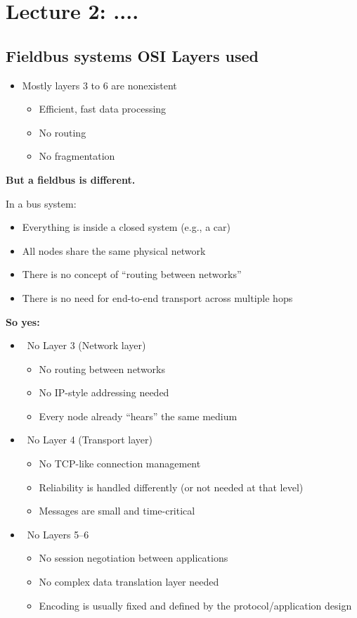 \chapter{Lecture 2: ....}\label{lec:2}
\section{Fieldbus systems OSI Layers used}

\begin{itemize}
\item Mostly layers 3 to 6 are nonexistent
\begin{itemize}
\item Efficient, fast data processing
\item No routing
\item No fragmentation
\end{itemize}
\end{itemize}

\textbf{But a fieldbus is different.}

In a bus system:

\begin{itemize}
\item Everything is inside a closed system (e.g., a car)
\item All nodes share the same physical network
\item There is no concept of ``routing between networks''
\item There is no need for end-to-end transport across multiple hops
\end{itemize}

\textbf{So yes:}

\begin{itemize}
\item \checkmark \ No Layer 3 (Network layer)
\begin{itemize}
\item No routing between networks
\item No IP-style addressing needed
\item Every node already ``hears'' the same medium
\end{itemize}

\item \checkmark \ No Layer 4 (Transport layer)
\begin{itemize}
\item No TCP-like connection management
\item Reliability is handled differently (or not needed at that level)
\item Messages are small and time-critical
\end{itemize}

\item \checkmark \ No Layers 5--6
\begin{itemize}
\item No session negotiation between applications
\item No complex data translation layer needed
\item Encoding is usually fixed and defined by the protocol/application design
\end{itemize}
\end{itemize}

